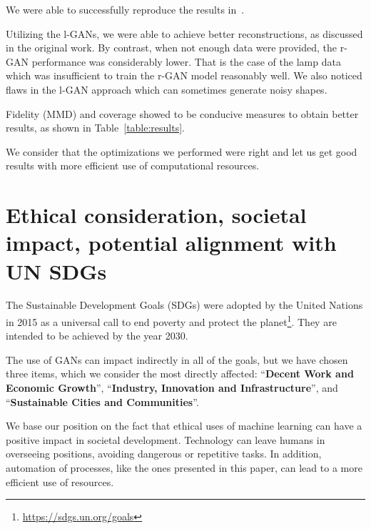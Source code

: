 \documentclass[12pt]{article}
\newcommand{\contentdescription}[1]{}
\begin{document}
    We were able to successfully reproduce the results in~\cite{pmlr-v80-achlioptas18a}.

    Utilizing the l-GANs, we were able to achieve better reconstructions, as discussed in the original work.
    By contrast, when not enough data were provided, the r-GAN performance was considerably lower. That is the case of the lamp data which was insufficient to train the r-GAN model reasonably well.
    We also noticed flaws in the l-GAN approach which can sometimes generate noisy shapes.

    Fidelity (MMD) and coverage showed to be conducive measures to obtain better results, as shown in Table~\ref{table:results}.

    We consider that the optimizations we performed were right and let us get good results with more efficient use of computational resources.


    \section{Ethical consideration, societal impact, potential alignment with UN SDGs}
    \contentdescription{
        Ethical consideration, societal impact, potential alignment with UN SDGs (5-10\%):
        Think and research!
        Are there any ethical considerations for the original paper, its problem or method, its way of conducting experiments?
        How about your task, your datasets, and the experiments you did?
        What societal impact can you imagine about the original paper and its contributions and results?
        How about your project report?
        How do you think this paper can push the UN SDG targets?
    }

    The Sustainable Development Goals (SDGs) were adopted by the United Nations in 2015 as a universal call
    to end poverty and protect the planet\footnote{\url{https://sdgs.un.org/goals}}. They are intended to be achieved by the year 2030.

    The use of GANs can impact indirectly in all of the goals, but we have chosen three items, which we consider the most directly affected:
    ``\textbf{Decent Work and Economic Growth}'', ``\textbf{Industry, Innovation and Infrastructure}'', and
    ``\textbf{Sustainable Cities and Communities}''.

    We base our position on the fact that ethical uses of machine learning can have a positive impact in societal development.
    Technology can leave humans in overseeing positions, avoiding dangerous or repetitive tasks.
    In addition, automation of processes, like the ones presented in this paper, can lead to a more efficient use of resources.
\end{document}
